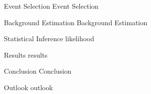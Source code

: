 \begin{frame}[fragile]{Event Selection}
  Event Selection
\end{frame}

\begin{frame}[fragile]{Background Estimation}
  Background Estimation
\end{frame}

\begin{frame}[fragile]{Statistical Inference}
  likelihood
\end{frame}

\begin{frame}[fragile]{Results}
  results
\end{frame}

\begin{frame}[fragile]{Conclusion}
  Conclusion
\end{frame}

\begin{frame}[fragile]{Outlook}
  outlook
\end{frame}
